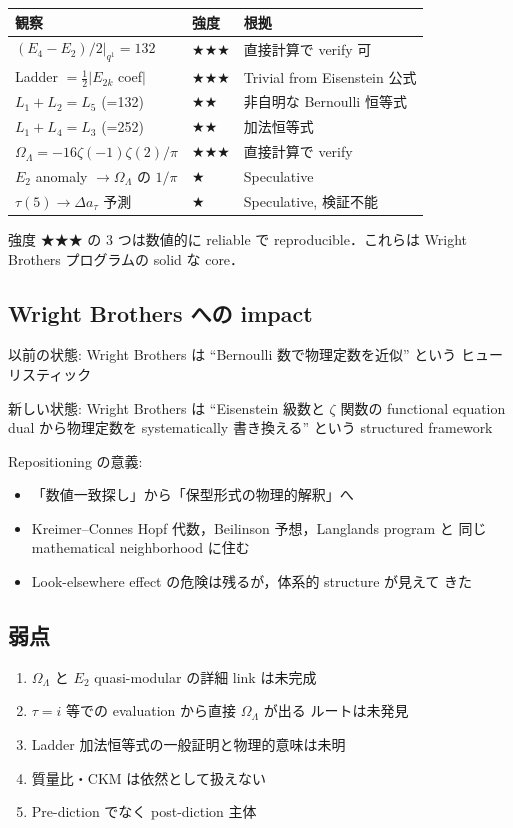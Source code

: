 \documentclass[11pt,a4paper]{article}
\begin{document}
\begin{center}
\begin{tabular}{lll}
\toprule
観察 & 強度 & 根拠 \\
\midrule
$(E_4-E_2)/2|_{q^1} = 132$ & ★★★ & 直接計算で verify 可 \\
Ladder $= \frac{1}{2}|E_{2k}$ coef$|$ & ★★★ & Trivial from Eisenstein 公式 \\
$L_1 + L_2 = L_5$ (=132) & ★★ & 非自明な Bernoulli 恒等式 \\
$L_1 + L_4 = L_3$ (=252) & ★★ & 加法恒等式 \\
$\Omega_\Lambda = -16\zeta(-1)\zeta(2)/\pi$ & ★★★ & 直接計算で verify \\
$E_2$ anomaly $\to \Omega_\Lambda$ の $1/\pi$ & ★ & Speculative \\
$\tau(5) \to \Delta a_\tau$ 予測 & ★ & Speculative, 検証不能 \\
\bottomrule
\end{tabular}
\end{center}

強度 ★★★ の 3 つは数値的に reliable で reproducible．これらは
Wright Brothers プログラムの solid な core．

\subsection{Wright Brothers への impact}

以前の状態: Wright Brothers は ``Bernoulli 数で物理定数を近似'' という
ヒューリスティック

新しい状態: Wright Brothers は ``Eisenstein 級数と $\zeta$ 関数の
functional equation dual から物理定数を systematically 書き換える''
という structured framework

Repositioning の意義:
\begin{itemize}
\item 「数値一致探し」から「保型形式の物理的解釈」へ
\item Kreimer--Connes Hopf 代数，Beilinson 予想，Langlands program と
同じ mathematical neighborhood に住む
\item Look-elsewhere effect の危険は残るが，体系的 structure が見えて
きた
\end{itemize}

\subsection{弱点}

\begin{enumerate}
\item $\Omega_\Lambda$ と $E_2$ quasi-modular の詳細 link は未完成
\item $\tau = i$ 等での evaluation から直接 $\Omega_\Lambda$ が出る
ルートは未発見
\item Ladder 加法恒等式の一般証明と物理的意味は未明
\item 質量比・CKM は依然として扱えない
\item Pre-diction でなく post-diction 主体
\end{enumerate}
\end{document}

